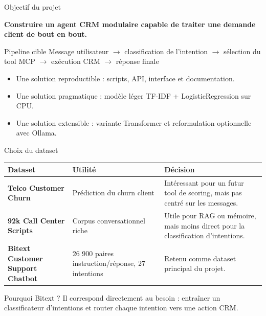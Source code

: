 \documentclass[aspectratio=169,10pt]{beamer}
\begin{document}
\begin{frame}{Objectif du projet}
    \begin{center}
        \large
        \textbf{Construire un agent CRM modulaire capable de traiter une demande client de bout en bout.}
    \end{center}

    \vspace{0.25cm}
    \begin{block}{Pipeline cible}
        Message utilisateur
        $\rightarrow$ classification de l'intention
        $\rightarrow$ sélection du tool MCP
        $\rightarrow$ exécution CRM
        $\rightarrow$ réponse finale
    \end{block}

    \vspace{0.2cm}
    \begin{itemize}
        \item Une solution reproductible : scripts, API, interface et documentation.
        \item Une solution pragmatique : modèle léger TF-IDF + LogisticRegression sur CPU.
        \item Une solution extensible : variante Transformer et reformulation optionnelle avec Ollama.
    \end{itemize}
\end{frame}

\begin{frame}{Choix du dataset}
    \begin{table}
        \small
        \begin{tabular}{>{\bfseries}p{}p{}p{}}
            \toprule
            Dataset & Utilité & Décision \\
            \midrule
            Telco Customer Churn & Prédiction du churn client & Intéressant pour un futur tool de scoring, mais pas centré sur les messages. \\
            92k Call Center Scripts & Corpus conversationnel riche & Utile pour RAG ou mémoire, mais moins direct pour la classification d'intentions. \\
            Bitext Customer Support Chatbot & 26 900 paires instruction/réponse, 27 intentions & Retenu comme dataset principal du projet. \\
            \bottomrule
        \end{tabular}
    \end{table}

    \vspace{0.1cm}
    \begin{block}{Pourquoi Bitext ?}
        Il correspond directement au besoin : entraîner un classificateur d'intentions et router chaque intention vers une action CRM.
    \end{block}
\end{frame}
\end{document}
